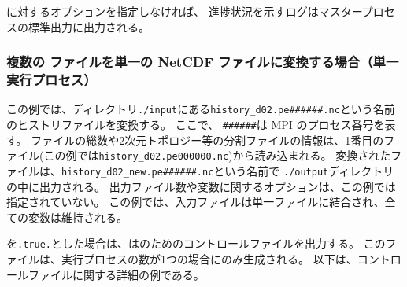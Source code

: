 に対するオプションを指定しなければ、
進捗状況を示すログはマスタープロセスの標準出力に出力される。

\subsubsection{複数の \scalenetcdf ファイルを単一の NetCDF ファイルに変換する場合（単一実行プロセス）}


この例では、ディレクトリ\verb|./input|にある\verb|history_d02.pe######.nc|という名前のヒストリファイルを変換する。
ここで、 \verb|######|は MPI のプロセス番号を表す。
ファイルの総数や2次元トポロジー等の分割ファイルの情報は、1番目のファイル(この例では\verb|history_d02.pe000000.nc|)から読み込まれる。
変換されたファイルは、\verb|history_d02_new.pe######.nc|という名前で \verb|./output|ディレクトリの中に出力される。
出力ファイル数や変数に関するオプションは、この例では指定されていない。
この例では、入力ファイルは単一ファイルに結合され、全ての変数は維持される。

を\verb|.true.|とした場合は、\sno は{\grads}のためのコントロールファイルを出力する。
このファイルは、実行プロセスの数が1つの場合にのみ生成される。
以下は、コントロールファイルに関する詳細の例である。

